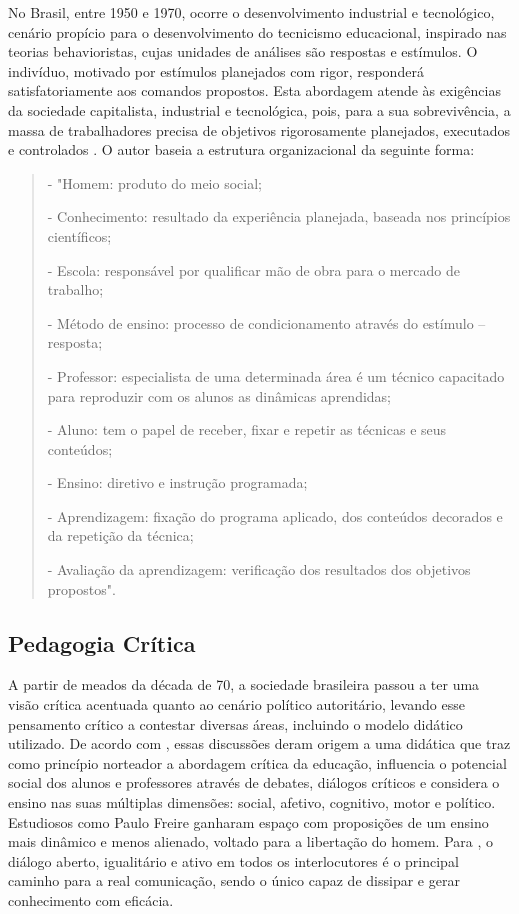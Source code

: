 No Brasil, entre 1950 e 1970, ocorre o desenvolvimento industrial e tecnológico, cenário propício para o desenvolvimento do tecnicismo educacional, inspirado nas teorias behavioristas, cujas unidades de análises são respostas e estímulos. O indivíduo, motivado por estímulos planejados com rigor, responderá satisfatoriamente aos comandos propostos. Esta abordagem atende às exigências da sociedade capitalista, industrial e tecnológica, pois, para a sua sobrevivência, a massa de trabalhadores precisa de objetivos rigorosamente planejados, executados e controlados \cite{larchert}.
O autor baseia a estrutura organizacional da seguinte forma:
\begin{quote}- "Homem: produto do meio social;
	
- Conhecimento: resultado da experiência planejada, baseada nos princípios científicos;

- Escola: responsável por qualificar mão de obra para o mercado de trabalho;

- Método de ensino: processo de condicionamento através do estímulo – resposta;

- Professor: especialista de uma determinada área é um técnico capacitado para reproduzir com os alunos as dinâmicas aprendidas;

- Aluno: tem o papel de receber, fixar e repetir as técnicas e seus conteúdos;

- Ensino: diretivo e instrução programada;

- Aprendizagem: fixação do programa aplicado, dos conteúdos decorados e da repetição da técnica;

- Avaliação da aprendizagem: verificação dos resultados dos objetivos propostos".
\end{quote}

\subsection{Pedagogia Crítica}\label{sec:ped_crit}

A partir de meados da década de 70, a sociedade brasileira passou a ter uma visão crítica acentuada quanto ao cenário político autoritário, levando esse pensamento crítico a contestar diversas áreas, incluindo o modelo didático utilizado. De acordo com \cite{martins}, essas discussões deram origem a uma didática que traz como princípio norteador a abordagem crítica da educação, influencia o potencial social dos alunos e professores através de debates, diálogos críticos e considera o ensino nas suas múltiplas dimensões: social, afetivo, cognitivo, motor e político. Estudiosos como Paulo Freire ganharam espaço com proposições de um ensino mais dinâmico e menos alienado, voltado para a libertação do homem. Para \cite{freire}, o diálogo aberto, igualitário e ativo em todos os interlocutores é o principal caminho para a real comunicação, sendo o único capaz de dissipar e gerar conhecimento com eficácia.


